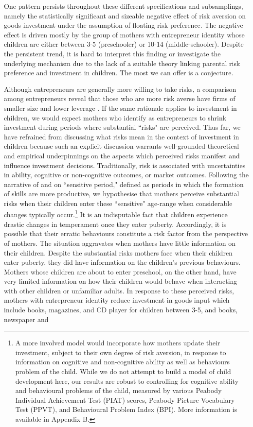 \documentclass[emulatestandardclasses, 10pt, abstract = true]{scrartcl}
\begin{document}
One pattern persists throughout these different specifications and subsamplings, namely the statistically significant and sizeable negative effect of risk aversion on goods investment under the assumption of floating risk preference. The negative effect is driven mostly by the group of mothers with entrepreneur identity whose children are either between 3-5 (preschooler) or 10-14 (middle-schooler). Despite the persistent trend, it is hard to interpret this finding or investigate the underlying mechanism due to the lack of a suitable theory linking parental risk preference and investment in children. The most we can offer is a conjecture. 

Although entrepreneurs are generally more willing to take risks, a comparison among entrepreneurs reveal that those who are more risk averse have firms of smaller size and lower leverage \citep{herranz2015entrepreneurs}. If the same rationale applies to investment in children, we would expect mothers who identify as entrepreneurs to shrink investment during periods where substantial ``risks" are perceived. Thus far, we have refrained from discussing what risks mean in the context of investment in children because such an explicit discussion warrants well-grounded theoretical and empirical underpinnings on the aspects which perceived risks manifest and influence investment decisions. Traditionally, risk is associated with uncertainties in ability, cognitive or non-cognitive outcomes, or market outcomes. Following the narrative of \citet{knudsen2006economic} and \citet{cunha2007technology} on ``sensitive period," defined as periods in which the formation of skills are more productive, we hypothesise that mothers perceive substantial risks when their children enter these ``sensitive" age-range when considerable changes typically occur.\footnote{A more involved model would incorporate how mothers update their investment, subject to their own degree of risk aversion, in response to information on cognitive and non-cognitive ability as well as behaviours problem of the child. While we do not attempt to build a model of child development here, \alert{our results are robust to controlling for cognitive ability and behavioural problems of the child, measured by various Peabody Individual Achievement Test (PIAT) scores, Peabody Picture Vocabulary Test (PPVT), and Behavioural Problem Index (BPI). More information is available in \alert{Appendix B}.}} It is an indisputable fact that children experience drastic changes in temperament once they enter puberty. Accordingly, it is possible that their erratic behaviours constitute a risk factor from the perspective of mothers. The situation aggravates when mothers have little information on their children. Despite the substantial risks mothers face when their children enter puberty, they did have information on the children's previous behaviours. Mothers whose children are about to enter preschool, on the other hand, have very limited information on how their children would behave when interacting with other children or unfamiliar adults. In response to these perceived risks, mothers with entrepreneur identity reduce investment in goods input which include books, magazines, and CD player for children between 3-5, and books, newspaper and 
\end{document}
